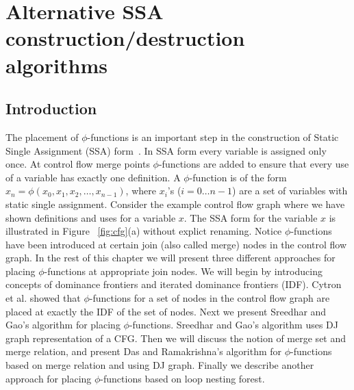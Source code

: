 \chapter{Alternative SSA construction/destruction algorithms
   }
\graphicspath{{img/}{alternative_ssa_construction_algorithms/img/}{part1/alternative_ssa_construction_algorithms/img/}}


%


%


\section{Introduction}

The  placement  of $\phi$-functions
is an important step in the construction of Static Single Assignment 
(SSA) form~\cite{CytronEtAl91}.
 In SSA form
 every variable is assigned 
only once. At control flow merge points $\phi$-functions are added 
 to ensure that every use of a variable has exactly 
one definition. 
A $\phi$-function is of the form $x_n = \phi(x_0,x_1, x_2, \ldots, x_{n-1})$,
where $x_i$'s ($i = 0 \ldots n-1$) are a set of variables with static single assignment. 
Consider the example control flow graph where we have shown definitions and uses for 
a variable $x$. The SSA form for the variable $x$ is illustrated in Figure ~\ref{fig:cfg}(a)
without explict renaming. 
Notice $\phi$-functions
have been introduced at certain join (also called merge) nodes in the control flow graph.
In the rest of this chapter we will present three different approaches  for placing $\phi$-functions
at appropriate join nodes. We will begin by introducing concepts of dominance frontiers and
iterated dominance frontiers (IDF). Cytron et al. showed that $\phi$-functions for a set of nodes in the
control flow graph are
placed at exactly the IDF of the set of nodes. Next we present Sreedhar and Gao's algorithm for
placing $\phi$-functions. Sreedhar and Gao's algorithm uses DJ graph representation of a CFG.
Then we will discuss the notion of merge set and merge relation, and present
Das and Ramakrishna's algorithm for $\phi$-functions based on merge relation and using DJ graph. Finally
we describe another approach for placing $\phi$-functions based on loop nesting forest.

